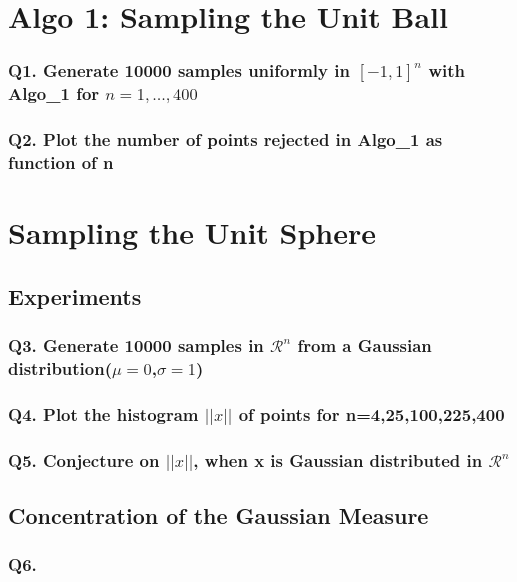 \documentclass[11pt]{article}
\begin{document}


\section{Algo 1: Sampling the Unit Ball}

\subsubsection{Q1. Generate 10000 samples uniformly in $[-1,1]^n$ with Algo_1 for $n=1,...,400$}

\subsubsection{Q2. Plot the number of points rejected in Algo_1 as function of n}

\section{Sampling the Unit Sphere}

\subsection{Experiments}

\subsubsection{Q3. Generate 10000 samples in $\mathcal{R}^n$ from a Gaussian distribution($\mu=0$,$\sigma=1$)}

\subsubsection{Q4. Plot the histogram $||x||$ of points for n=4,25,100,225,400}

\subsubsection{Q5. Conjecture on $||x||$, when x is Gaussian distributed in $\mathcal{R}^n$}

\subsection{Concentration of the Gaussian Measure}

\subsubsection{Q6. }
\end{document}
